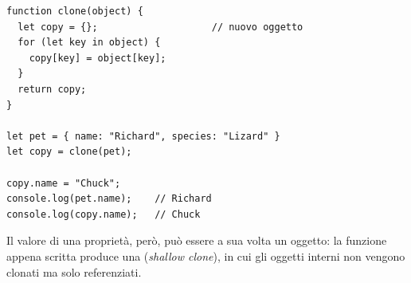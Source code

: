 \begin{affianco}[0.55][c]
\begin{lstlisting}[style=js, name=clone.js]
function clone(object) {
  let copy = {};                    // nuovo oggetto
  for (let key in object) {
    copy[key] = object[key];
  }
  return copy;
}

let pet = { name: "Richard", species: "Lizard" }
let copy = clone(pet);

copy.name = "Chuck";
console.log(pet.name);    // Richard
console.log(copy.name);   // Chuck
\end{lstlisting}
\risultato
\begin{immagine}
\end{immagine}
\end{affianco}

Il valore di una proprietà, però, può essere a sua volta un oggetto: la funzione
appena scritta produce una  (\textit{shallow clone}),
in cui gli oggetti interni non vengono clonati ma solo referenziati.

